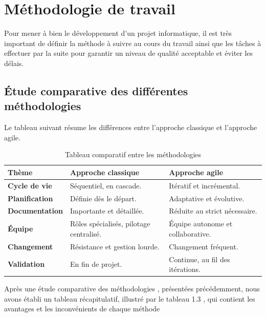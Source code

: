 \section{Méthodologie de travail}
Pour mener à bien le développement d'un projet informatique, il est très important de définir la méthode à suivre au cours du travail ainsi que les tâches à effectuer par la suite pour garantir un niveau de qualité acceptable et éviter les délais.

\subsection{Étude comparative des différentes méthodologies}
Le tableau suivant résume les différences entre l'approche classique et l'approche agile.

\begin{table}[H]
    \centering
    \renewcommand{\arraystretch}{1.3}
    \begin{tabular}{|>{\bfseries}p{3cm}|p{5.5cm}|p{5.5cm}|}
        \hline
        Thème & Approche classique & Approche agile \\
        \hline
        Cycle de vie & Séquentiel, en cascade. & Itératif et incrémental. \\
        \hline
        Planification & Définie dès le départ. & Adaptative et évolutive. \\
        \hline
        Documentation & Importante et détaillée. & Réduite au strict nécessaire. \\
        \hline
        Équipe & Rôles spécialisés, pilotage centralisé. & Équipe autonome et collaborative. \\
        \hline
        Changement & Résistance et gestion lourde. & Changement fréquent. \\
        \hline
        Validation & En fin de projet. & Continue, au fil des itérations. \\
        \hline
    \end{tabular}
    \caption{Tableau comparatif entre les méthodologies}
    \label{tab:comparaison_methodologies}
\end{table}
Après une étude comparative des méthodologies , présentées précédemment, nous
avons établi un tableau récapitulatif, illustré par le tableau 1.3 , qui contient les
avantages et les inconvénients de chaque méthode

\vspace{0.3cm}

